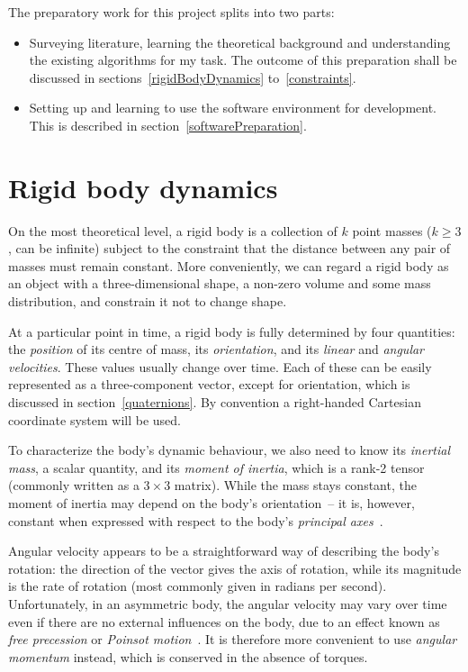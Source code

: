 The preparatory work for this project splits into two parts:
\begin{itemize}
\item Surveying literature, learning the theoretical background and understanding the existing
    algorithms for my task. The outcome of this preparation shall be discussed in
    sections~\ref{rigidBodyDynamics} to~\ref{constraints}.
\item Setting up and learning to use the software environment for development. This is described
    in section~\ref{softwarePreparation}.
\end{itemize}

\section{Rigid body dynamics\label{rigidBodyDynamics}}
On the most theoretical level, a rigid body is a collection of $k$ point masses ($k \ge 3$,
can be infinite) subject to the constraint that the distance between any pair of masses must
remain constant. More conveniently, we can regard a rigid body as an object with a
three-dimensional shape, a non-zero volume and some mass distribution, and constrain it not to
change shape.

At a particular point in time, a rigid body is fully determined by four quantities: the
\emph{position} of its centre of mass, its \emph{orientation}, and its \emph{linear} and
\emph{angular velocities}. These values usually change over time. Each of these can be easily
represented as a three-component vector, except for orientation, which is discussed in
section~\ref{quaternions}. By convention a right-handed Cartesian coordinate system will be used.

To characterize the body's dynamic behaviour, we also need to know its \emph{inertial mass},
a scalar quantity, and its \emph{moment of inertia}, which is a rank-2 tensor (commonly written
as a $3\times3$ matrix). While the mass stays constant, the moment of inertia may
depend on the body's orientation~-- it is, however, constant when expressed with respect to the
body's \emph{principal axes}~\cite{Feynman:63,Goldstein:80}.

Angular velocity appears to be a straightforward way of describing the body's rotation: the
direction of the vector gives the axis of rotation, while its magnitude is the rate of rotation
(most commonly given in radians per second). Unfortunately, in an asymmetric body, the angular
velocity may vary over time even if there are no external influences on the body, due to an effect
known as \emph{free precession} or \emph{Poinsot motion}~\cite{Goldstein:80,Julian:notes}. It is
therefore more convenient to use \emph{angular momentum} instead, which is conserved in the
absence of torques.

